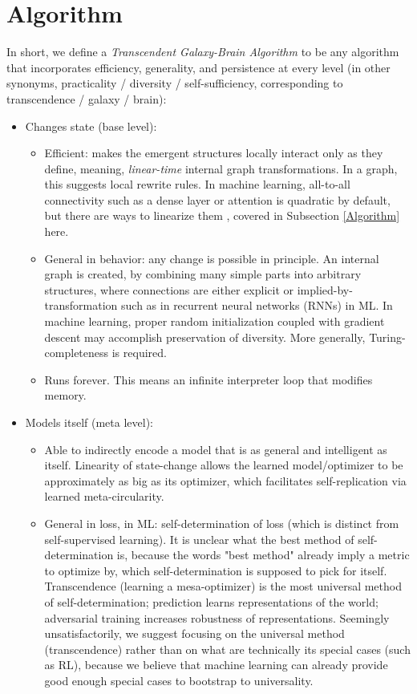 \documentclass{article}
\begin{document}
\section{Algorithm}

In short, we define a \textit{Transcendent Galaxy-Brain Algorithm} to be any algorithm that incorporates efficiency, generality, and persistence at every level (in other synonyms, practicality / diversity / self-sufficiency, corresponding to transcendence / galaxy / brain):

\begin{itemize}
\item Changes state (base level):
\begin{itemize}
\item Efficient: makes the emergent structures locally interact only as they define, meaning, \textit{linear-time} internal graph transformations. In a graph, this suggests local rewrite rules. In machine learning, all-to-all connectivity such as a dense layer or attention is quadratic by default, but there are ways to linearize them \cite{tolstikhin2021mlpmixer} \cite{schlag2021linear}, covered in Subsection \ref{Algorithm} here.
\item General in behavior: any change is possible in principle. An internal graph is created, by combining many simple parts into arbitrary structures, where connections are either explicit or implied-by-transformation such as in recurrent neural networks (RNNs) in ML. In machine learning, proper random initialization coupled with gradient descent may accomplish preservation of diversity. More generally, Turing-completeness is required.
\item Runs forever. This means an infinite interpreter loop that modifies memory.
\end{itemize}
\item Models itself (meta level):
\begin{itemize}
\item Able to indirectly encode a model that is as general and intelligent as itself. Linearity of state-change allows the learned model/optimizer to be approximately as big as its optimizer, which facilitates self-replication via learned meta-circularity.
\item General in loss, in ML: self-determination of loss (which is distinct from self-supervised learning). It is unclear what the best method of self-determination is, because the words "best method" already imply a metric to optimize by, which self-determination is supposed to pick for itself. Transcendence (learning a mesa-optimizer) is the most universal method of self-determination; prediction learns representations of the world; adversarial training increases robustness of representations. Seemingly unsatisfactorily, we suggest focusing on the universal method (transcendence) rather than on what are technically its special cases (such as RL), because we believe that machine learning can already provide good enough special cases to bootstrap to universality.

\end{itemize}
\end{itemize}
\end{document}
